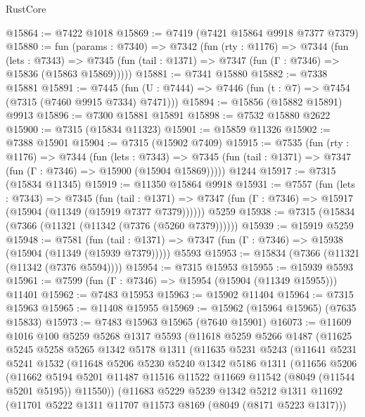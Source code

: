 \begin{lexlean}{RustCore}
\begin{coremodule}
@15864 := @7422 @1018
@15869 := @7419 (@7421 @15864 @9918 @7377 @7379)
@15880 := fun (params : @7340) =>
  @7342
    (fun (rty : @1176) =>
    @7344
      (fun (lets : @7343) =>
      @7345 (fun (tail : @1371) => @7347 (fun (Γ : @7346) => @15836 (@15863 @15869)))))
@15881 := @7341 @15880
@15882 := @7338 @15881
@15891 := @7445 (fun (U : @7444) => @7446 (fun (t : @7) => @7454 (@7315 (@7460 @9915 @7334) @7471)))
@15894 := @15856 (@15882 @15891) @9913
@15896 := @7300 @15881 @15891
@15898 := @7532 @15880 @2622
@15900 := @7315 (@15834 @11323)
@15901 := @15859 @11326
@15902 := @7388 @15901
@15904 := @7315 (@15902 @7409)
@15915 := @7535
    (fun (rty : @1176) =>
    @7344
      (fun (lets : @7343) =>
      @7345 (fun (tail : @1371) => @7347 (fun (Γ : @7346) => @15900 (@15904 @15869)))))
    @1244
@15917 := @7315 (@15834 @11345)
@15919 := @11350 @15864 @9918
@15931 := @7557
    (fun (lets : @7343) =>
    @7345
      (fun (tail : @1371) =>
      @7347 (fun (Γ : @7346) => @15917 (@15904 (@11349 (@15919 @7377 @7379))))))
    @5259
@15938 := @7315 (@15834 (@7366 (@11321 (@11342 (@7376 (@5260 @7379))))))
@15939 := @15919 @5259
@15948 := @7581
    (fun (tail : @1371) => @7347 (fun (Γ : @7346) => @15938 (@15904 (@11349 (@15939 @7379)))))
    @5593
@15953 := @15834 (@7366 (@11321 (@11342 (@7376 @5594))))
@15954 := @7315 @15953
@15955 := @15939 @5593
@15961 := @7599 (fun (Γ : @7346) => @15954 (@15904 (@11349 @15955))) @11401
@15962 := @7483 @15953
@15963 := @15902 @11404
@15964 := @7315 @15963
@15965 := @11408 @15955
@15969 := @15962 (@15964 @15965) (@7635 @15833)
@15973 := @7483 @15963 @15965 (@7640 @15901)
@16073 := @11609
    @1016
    @100
    @5259
    @5268
    @1317
    @5593
    (@11618
      @5259
      @5266
      @1487
      (@11625
        @5245
        @5258
        @5265
        @1342
        @5178
        @1311
        (@11635
          @5231
          @5243
          (@11641
            @5231
            @5241
            @1532
            (@11648
              @5206
              @5230
              @5240
              @1342
              @5186
              @1311
              (@11656
                @5206
                (@11662
                  @5194
                  @5201
                  @11487
                  @11516
                  @11522
                  @11669
                  @11542
                  (@8049 (@11544 @5201 @5195))
                  @11550))
              (@11683
                @5229
                @5239
                @1342
                @5212
                @1311
                @11692
                (@11701 @5222 @1311 @11707 @11573 @8169 (@8049 (@8171 @5223 @1317)))

\end{coremodule}
\end{lexlean}
